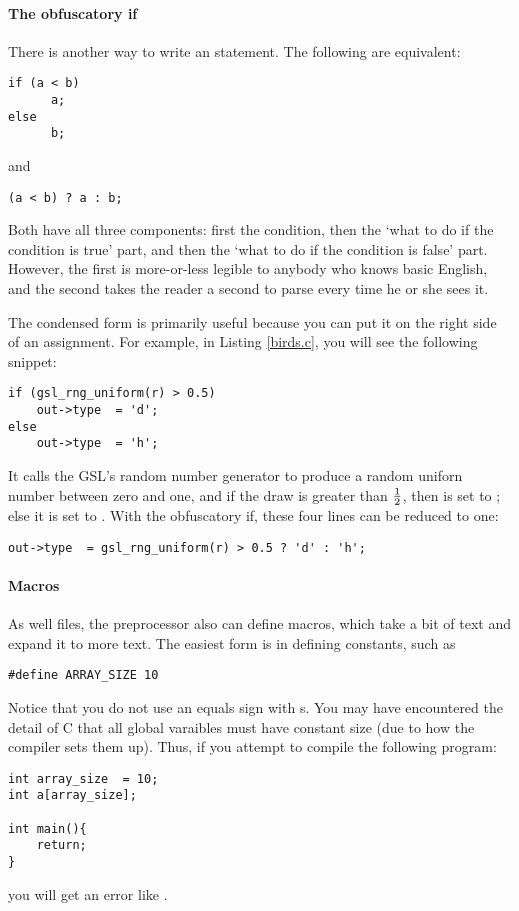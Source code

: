 \paragraph{The obfuscatory if} There is another way to write an  statement. The following are equivalent:
\begin{lstlisting}
if (a < b)
      a;
else
      b;
\end{lstlisting}
and
\begin{lstlisting}
(a < b) ? a : b;
\end{lstlisting}
Both have all three components: first the condition, then the `what to do if the
condition is true' part, and then the `what to do if the condition is false'
part. However, the first is more-or-less legible to anybody who knows basic English,
and the second takes the reader a second to parse every time he or she
sees it. 

The condensed form is primarily useful because you can put it on the
right side of an assignment. For example, in Listing \ref{birds.c}, you will see the 
following snippet:
\begin{lstlisting}
if (gsl_rng_uniform(r) > 0.5)
    out->type  = 'd';
else
    out->type  = 'h';
\end{lstlisting}
It calls the GSL's random number generator to produce a random uniforn
number between zero and one, and if the draw is greater than ${1\over 2}$,
then  is set to ; else it is set to . With
the obfuscatory if, these four lines can be reduced to one:
\begin{lstlisting}
out->type  = gsl_rng_uniform(r) > 0.5 ? 'd' : 'h';
\end{lstlisting}

\paragraph{Macros} \label{macros} 

As well  files, 
the preprocessor also can define macros, which take
a bit of text and expand it to more text. The easiest form is in
defining constants, such as 
\begin{lstlisting}
#define ARRAY_SIZE 10
\end{lstlisting}
Notice that you do not use an equals sign with s.  You may
have encountered the detail of C that all global varaibles must have
constant size (due to how the compiler sets them up). Thus, if you
attempt to compile the following program:
\begin{lstlisting}
int array_size  = 10;
int a[array_size];

int main(){
    return;
}
\end{lstlisting}
you will get an error like .

